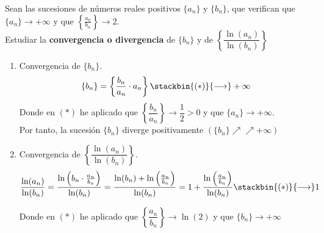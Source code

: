 \documentclass[12pt]{article}
\begin{document}
    \begin{ejercicio}[2 puntos]
        Sean las sucesiones de números reales positivos $\{a_n\}$ y $\{b_n\}$, que verifican que $\{a_n\}\longrightarrow +\infty$ y que $\left\{ \frac{a_n}{b_n}\right\}\longrightarrow 2$.\\

        Estudiar la \textbf{convergencia o divergencia} de $\{b_n\}$ y de $\left\{ \dfrac{\ln(a_n)}{\ln(b_n)}\right\}$
        
        \begin{enumerate}
            \item Convergencia de $\{b_n\}$.\\
            \begin{gather*}
                \{b_n\} = \left\{ \dfrac{b_n}{a_n} \cdot a_n\right\}\stackbin{(\ast)}{\longrightarrow} +\infty
            \end{gather*}
            Donde en $(\ast)$ he aplicado que $\left\{ \dfrac{b_n}{a_n}\right\}\longrightarrow \dfrac{1}{2}>0$ y que $\{a_n\}\longrightarrow +\infty$.\\
            Por tanto, la sucesión $\{b_n\}$ diverge positivamente $(\{b_n\} \nearrow \nearrow +\infty)$

            \item Convergencia de $\left\{ \dfrac{\ln(a_n)}{\ln(b_n)}\right\}$.\\
            \begin{gather*}
                \dfrac{\ln(a_n)}{\ln(b_n)} = \dfrac{ \ln\left( b_n \cdot \frac{a_n}{b_n}\right)}{\ln(b_n)} = \dfrac{ \ln(b_n) + \ln \left(\frac{a_n}{b_n}\right)}{\ln(b_n)} = 1+ \dfrac{\ln \left(\frac{a_n}{b_n}\right)}{\ln(b_n)}\stackbin{(\ast)}{\longrightarrow} 1
            \end{gather*}

            Donde en $(\ast)$ he aplicado que $\left\{ \dfrac{a_n}{b_n}\right\}\longrightarrow \ln(2)$ y que $\{b_n\}\longrightarrow +\infty$
        \end{enumerate}

        
    \end{ejercicio}
\end{document}
